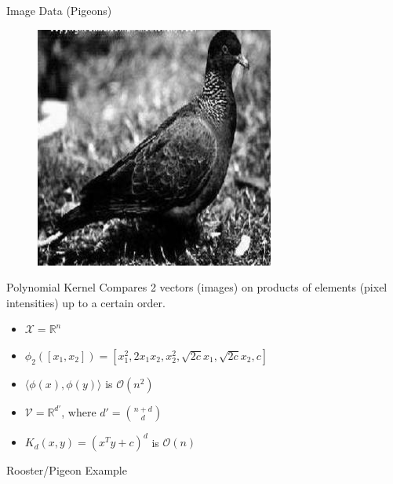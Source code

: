 \documentclass{beamer}
\begin{document}
\begin{frame}{Image Data (Pigeons)}
\begin{figure}
    \includegraphics[scale=.35]{pigeonrs-image_0004.jpg}
  \end{figure}
\end{frame}

\begin{frame}{Polynomial Kernel}
  Compares 2 vectors (images) on products of elements (pixel intensities)
  up to a certain order.
  \begin{itemize}
    \item $\mathcal{X} = \mathbb{R}^{n}$ \pause
    \item $\phi_2 ([x_1, x_2]) = [x_1^2,  2x_1x_2,  x_2^2, \sqrt{2c}x_1, \sqrt{2c}x_2, c]$ \pause
    \item $\langle \phi(x), \phi(y) \rangle$ is $\mathcal{O}(n^2)$ \pause
    \item $\mathcal{V} = \mathbb{R}^{d'}$, where $d' = \binom{n+d}{d}$ \pause
    \item $K_d(x,y) = (x^T y  + c)^d$ is $\mathcal{O}(n)$
  \end{itemize}
\end{frame}

\begin{frame}{Rooster/Pigeon Example}
  \begin{center}
    \resizebox{10.0cm}{!}{
      
    }
  \end{center}
\end{frame}
\end{document}
